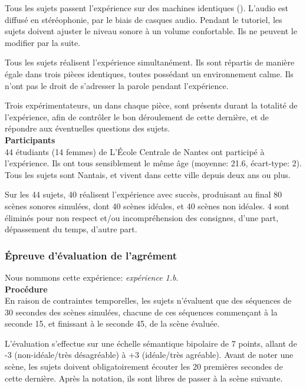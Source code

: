 Tous les sujets passent l'expérience sur des machines identiques (). L'audio est diffusé en stéréophonie, par le biais de casques audio. Pendant le tutoriel, les sujets doivent ajuster le niveau sonore à un volume confortable. Ils ne peuvent le modifier par la suite.

Tous les sujets réalisent l'expérience simultanément. Ils sont répartis de manière égale dans trois pièces identiques, toutes possédant un environnement calme. Ils n'ont pas le droit de s'adresser la parole pendant l'expérience.

Trois expérimentateurs, un dans chaque pièce, sont présents durant la totalité de l'expérience, afin de contrôler le bon déroulement de cette dernière, et de répondre aux éventuelles questions des sujets.  \\

\textbf{Participants} \\

44 étudiants (14 femmes) de L’École Centrale de Nantes ont participé à l'expérience. Ils ont tous sensiblement le même âge (moyenne: 21.6, écart-type: 2). Tous les sujets sont Nantais, et vivent dans cette ville depuis deux ans ou plus.

Sur les 44 sujets, 40 réalisent l'expérience avec succès, produisant au final 80 scènes sonores simulées, dont 40 scènes idéales, et 40 scènes non idéales. 4 sont éliminés pour non respect et/ou incompréhension des consignes, d'une part, dépassement du temps, d'autre part.



\subsubsection{Épreuve d'évaluation de l'agrément}
\label{sec:ch5_planExpEvaA}

Nous nommons cette expérience: \emph{expérience 1.b}. \\

\textbf{Procédure} \\

En raison de contraintes temporelles, les sujets n'évaluent que des séquences de 30 secondes des scènes simulées, chacune de ces séquences commençant à la seconde 15, et finissant à le seconde 45, de la scène évaluée.

L'évaluation s'effectue sur une échelle sémantique bipolaire de 7 points, allant de -3 (non-idéale/très désagréable) à +3 (idéale/très agréable). Avant de noter une scène, les sujets doivent obligatoirement écouter les 20 premières secondes de cette dernière. Après la notation, ils sont libres de passer à la scène suivante.

